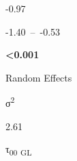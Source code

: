 \documentclass[
  letterpaper,
  DIV=11,
  numbers=noendperiod]{scrartcl}
\begin{document}
\begin{table}
\begin{minipage}[t]{\linewidth}
{\centering 

-0.97

}

\end{minipage}%
\newline
\begin{minipage}[t]{\linewidth}

{\centering 

-1.40~--~-0.53

}

\end{minipage}%
\newline
\begin{minipage}[t]{\linewidth}

{\centering 

\textbf{\textless0.001}

}

\end{minipage}%
\newline
\begin{minipage}[t]{\linewidth}

{\centering 

Random Effects

}

\end{minipage}%
\newline
\begin{minipage}[t]{\linewidth}

{\centering 

σ\textsuperscript{2}

}

\end{minipage}%
\newline
\begin{minipage}[t]{\linewidth}

{\centering 

2.61

}

\end{minipage}%
\newline
\begin{minipage}[t]{\linewidth}

{\centering 

τ\textsubscript{00} \textsubscript{GL}

}

\end{minipage}%
\newline
\begin{minipage}[t]{\linewidth}


\end{minipage}
\end{table}
\end{document}
